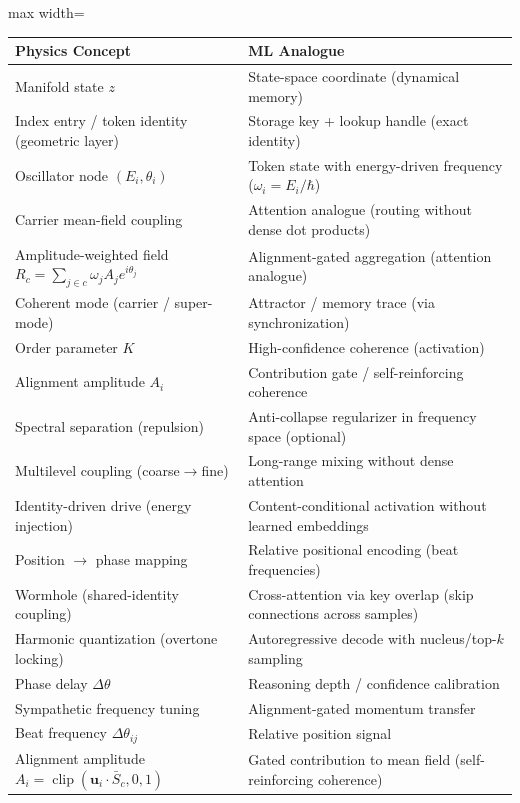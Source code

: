 \documentclass[11pt,a4paper]{article}
\begin{document}
\begin{center}
\renewcommand{\arraystretch}{1.3}
\begin{adjustbox}{max width=\textwidth}
\begin{tabular}{l l}
\toprule
\textbf{Physics Concept} & \textbf{ML Analogue} \\
\midrule
Manifold state $z$ & State-space coordinate (dynamical memory) \\
Index entry / token identity (geometric layer) & Storage key + lookup handle (exact identity) \\
Oscillator node $(E_i, \theta_i)$ & Token state with energy-driven frequency (\(\omega_i=E_i/\hbar\)) \\
Carrier mean-field coupling & Attention analogue (routing without dense dot products) \\
Amplitude-weighted field $R_c=\sum_{j\in c} \omega_j A_j e^{i\theta_j}$ & Alignment-gated aggregation (attention analogue) \\
Coherent mode (carrier / super-mode) & Attractor / memory trace (via synchronization) \\
Order parameter $K$ & High-confidence coherence (activation) \\
Alignment amplitude $A_i$ & Contribution gate / self-reinforcing coherence \\
Spectral separation (repulsion) & Anti-collapse regularizer in frequency space (optional) \\
Multilevel coupling (coarse\(\to\)fine) & Long-range mixing without dense attention \\
Identity-driven drive (energy injection) & Content-conditional activation without learned embeddings \\
Position $\to$ phase mapping & Relative positional encoding (beat frequencies) \\
Wormhole (shared-identity coupling) & Cross-attention via key overlap (skip connections across samples) \\
Harmonic quantization (overtone locking) & Autoregressive decode with nucleus/top-$k$ sampling \\
Phase delay $\Delta\theta$ & Reasoning depth / confidence calibration \\
Sympathetic frequency tuning & Alignment-gated momentum transfer \\
Beat frequency $\Delta\theta_{ij}$ & Relative position signal \\
Alignment amplitude $A_i = \operatorname{clip}(\mathbf{u}_i \cdot \bar{S}_c, 0, 1)$ & Gated contribution to mean field (self-reinforcing coherence) \\

\end{tabular}
\end{adjustbox}
\end{center}
\end{document}
